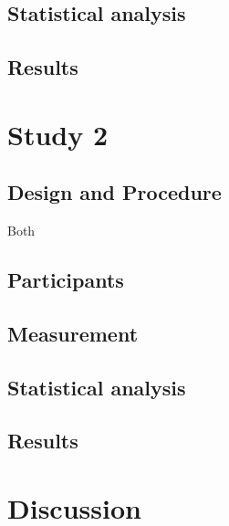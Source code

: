 \documentclass[man]{apa6}
\begin{document}
\hypertarget{statistical-analysis}{%
\subsection{Statistical analysis}\label{statistical-analysis}}

\hypertarget{results}{%
\subsection{Results}\label{results}}

\hypertarget{study-2}{%
\section{Study 2}\label{study-2}}

\hypertarget{design-and-procedure}{%
\subsection{Design and Procedure}\label{design-and-procedure}}

Both

\hypertarget{participants-1}{%
\subsection{Participants}\label{participants-1}}

\hypertarget{measurement}{%
\subsection{Measurement}\label{measurement}}

\hypertarget{statistical-analysis-1}{%
\subsection{Statistical analysis}\label{statistical-analysis-1}}

\hypertarget{results-1}{%
\subsection{Results}\label{results-1}}

\hypertarget{discussion}{%
\section{Discussion}\label{discussion}}

\newpage
\end{document}
